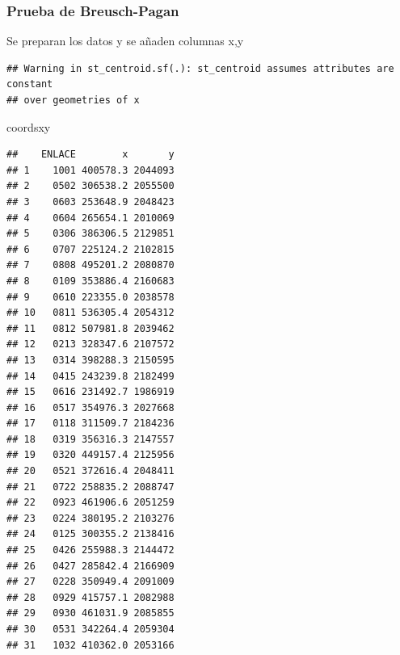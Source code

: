 \documentclass[11pt,]{article}
\newenvironment{Shaded}{\begin{snugshade}}{\end{snugshade}}
\newcommand{\KeywordTok}[1]{\textcolor[rgb]{0.13,0.29,0.53}{\textbf{#1}}}
\newcommand{\DataTypeTok}[1]{\textcolor[rgb]{0.13,0.29,0.53}{#1}}
\newcommand{\DecValTok}[1]{\textcolor[rgb]{0.00,0.00,0.81}{#1}}
\newcommand{\StringTok}[1]{\textcolor[rgb]{0.31,0.60,0.02}{#1}}
\newcommand{\OperatorTok}[1]{\textcolor[rgb]{0.81,0.36,0.00}{\textbf{#1}}}
\newcommand{\NormalTok}[1]{#1}
\begin{document}
\subsubsection{Prueba de Breusch-Pagan}\label{prueba-de-breusch-pagan-1}

Se preparan los datos y se añaden columnas x,y

\begin{Shaded}
\end{Shaded}

\begin{verbatim}
## Warning in st_centroid.sf(.): st_centroid assumes attributes are constant
## over geometries of x
\end{verbatim}

\begin{Shaded}
\begin{Highlighting}[]
\NormalTok{coordsxy}
\end{Highlighting}
\end{Shaded}

\begin{verbatim}
##    ENLACE        x       y
## 1    1001 400578.3 2044093
## 2    0502 306538.2 2055500
## 3    0603 253648.9 2048423
## 4    0604 265654.1 2010069
## 5    0306 386306.5 2129851
## 6    0707 225124.2 2102815
## 7    0808 495201.2 2080870
## 8    0109 353886.4 2160683
## 9    0610 223355.0 2038578
## 10   0811 536305.4 2054312
## 11   0812 507981.8 2039462
## 12   0213 328347.6 2107572
## 13   0314 398288.3 2150595
## 14   0415 243239.8 2182499
## 15   0616 231492.7 1986919
## 16   0517 354976.3 2027668
## 17   0118 311509.7 2184236
## 18   0319 356316.3 2147557
## 19   0320 449157.4 2125956
## 20   0521 372616.4 2048411
## 21   0722 258835.2 2088747
## 22   0923 461906.6 2051259
## 23   0224 380195.2 2103276
## 24   0125 300355.2 2138416
## 25   0426 255988.3 2144472
## 26   0427 285842.4 2166909
## 27   0228 350949.4 2091009
## 28   0929 415757.1 2082988
## 29   0930 461031.9 2085855
## 30   0531 342264.4 2059304
## 31   1032 410362.0 2053166
\end{verbatim}
\end{document}
